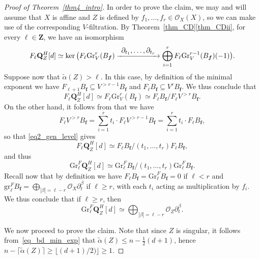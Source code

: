 \documentclass[JEP,XML,SOM,Unicode]{cedram}
\newcommand{\To}[1]{\mathchoice{\xrightarrow{\textstyle\kern4pt#1\kern3pt}}{\stackrel{#1}{\longrightarrow}}{}{}}
\theoremstyle{plain}
\theoremstyle{definition}
\newcommand\Z{{\mathbf Z}}
\newcommand\Q{{\mathbf Q}}
\newcommand\cO{\mathcal{O}}
\newcommand\cO{\mathcal{O}}
\newcommand\bff{{\boldsymbol f}}
\newcommand\gr{\mathrm{Gr}}
\begin{document}
\begin{proof}[Proof of Theorem~\ref{thm4_intro}]
In order to prove the claim, we may and will assume that $X$ is affine and $Z$ is defined by $f_1,\ldots,f_r\in\cO_X(X)$, so we can make use
of the corresponding $V$-filtration. By Theorem~\ref{thm_CD}\eqref{thm_CDii}, for every $\ell\in\Z$, we have an isomorphism\vspace*{-3pt}
\[F_{\ell}\Q^H_Z[d]\simeq \ker\big(F_{\ell}\gr_V^r(B_{\bff})\To{\partial_{t_1},\ldots,\partial_{t_r}}
\bigoplus_{i=1}^rF_{\ell}\gr_V^{r-1}(B_{\bff})(-1)\big).\]
Suppose now that $\widetilde{\alpha}(Z)>\ell$. In this case, by definition of the minimal exponent we have
$F_{\ell+1}B_{\bff}\subseteq V^{>r-1}B_{\bff}$ and $F_{\ell}B_{\bff}
\subseteq V^rB_{\bff}$. We thus conclude that\vspace*{-3pt}
\begin{equation}\label{eq2_gen_level}
F_{\ell}\Q^H_Z[d]\simeq F_{\ell}\gr_V^r(B_{\bff})\simeq F_{\ell}B_{\bff}/F_{\ell}V^{>r}B_{\bff}.
\end{equation}
On the other hand, it follows from \cite[Th.\,1.1]{CD} that we have\vspace*{-3pt}
\[F_{\ell}V^{>r}B_{\bff}=\sum_{i=1}^rt_i\cdot F_{\ell}V^{>r-1}B_{\bff}=\sum_{i=1}^rt_i\cdot F_{\ell}B_{\bff},\]
so that \eqref{eq2_gen_level} gives\vspace*{-3pt}
\[F_{\ell}\Q^H_Z[d]\simeq F_{\ell}B_{\bff}/(t_1,\ldots,t_r)F_{\ell}B_{\bff},\]
and thus\vspace*{-3pt}
\[\gr_{\ell}^F\Q_Z^H[d]\simeq \gr^F_{\ell}B_{\bff}/(t_1,\ldots,t_r)\gr^F_{\ell}B_{\bff}.\]
Recall now that by definition we have
$F_\ell B_\bff = \gr^F_\ell B_\bff = 0$ if $\ell < r$ and $\mathrm{gr}^F_{\ell}B_{\bff}=\bigoplus_{|\beta| = \ell -r}\cO_X\partial_t^{\beta}$ if $\ell\geq r$,
with each $t_i$ acting as multiplication by $f_i$. We thus conclude that if $\ell\geq r$, then\vspace*{-3pt}
\begin{equation}\label{eq3_gen_level}
\gr_{\ell}^F\Q_Z^H[d]\simeq\bigoplus_{|\beta| = \ell -r}\cO_Z\partial_t^{\beta}.
\end{equation}

We now proceed to prove the claim. Note that since $Z$ is singular, it follows from~\eqref{eq_bd_min_exp} that
$\widetilde{\alpha}(Z)\leq n-\tfrac{1}{2}(d+1)$, hence $n-\lceil \widetilde{\alpha}(Z)\rceil\geq\lfloor (d+1)/2)\rfloor\geq 1$.


\end{proof}
\end{document}
